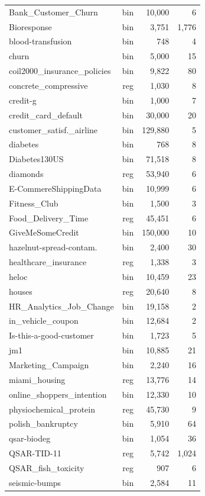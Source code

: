 \documentclass[sigconf,anonymous,review]{acmart}
\begin{document}
\begin{table}[t]
\begin{tabular}[t]{@{}l c r r@{}}
Bank\_Customer\_Churn & bin & 10,000 & 6 \\
Bioresponse & bin & 3,751 & 1,776 \\
blood-transfusion & bin & 748 & 4 \\
churn & bin & 5,000 & 15 \\
coil2000\_insurance\_policies & bin & 9,822 & 80 \\
concrete\_compressive & reg & 1,030 & 8 \\
credit-g & bin & 1,000 & 7 \\
credit\_card\_default & bin & 30,000 & 20 \\
customer\_satisf.\_airline & bin & 129,880 & 5 \\
diabetes & bin & 768 & 8 \\
Diabetes130US & bin & 71,518 & 8 \\
diamonds & reg & 53,940 & 6 \\
E-CommereShippingData & bin & 10,999 & 6 \\
Fitness\_Club & bin & 1,500 & 3 \\
Food\_Delivery\_Time & reg & 45,451 & 6 \\
GiveMeSomeCredit & bin & 150,000 & 10 \\
hazelnut-spread-contam. & bin & 2,400 & 30 \\
healthcare\_insurance & reg & 1,338 & 3 \\
heloc & bin & 10,459 & 23 \\
houses & reg & 20,640 & 8 \\
HR\_Analytics\_Job\_Change & bin & 19,158 & 2 \\
in\_vehicle\_coupon & bin & 12,684 & 2 \\
Is-this-a-good-customer & bin & 1,723 & 5 \\
jm1 & bin & 10,885 & 21 \\
Marketing\_Campaign & bin & 2,240 & 16 \\
miami\_housing & reg & 13,776 & 14 \\
online\_shoppers\_intention & bin & 12,330 & 10 \\
physiochemical\_protein & reg & 45,730 & 9 \\
polish\_bankruptcy & bin & 5,910 & 64 \\
qsar-biodeg & bin & 1,054 & 36 \\
QSAR-TID-11 & reg & 5,742 & 1,024 \\
QSAR\_fish\_toxicity & reg & 907 & 6 \\
seismic-bumps & bin & 2,584 & 11 \\

\end{tabular}
\end{table}
\end{document}
